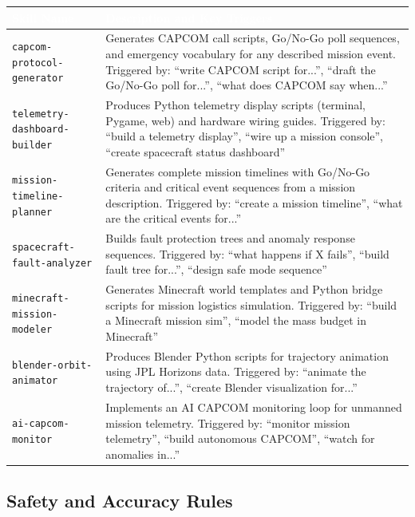 \documentclass[11pt,letterpaper]{article}
\newcommand{\tableheader}[1]{\textbf{\sffamily\textcolor{white}{#1}}}
\begin{document}
\begin{center}
\begin{tabularx}{\textwidth}{L{4.5cm}X}
\toprule
{}
\tableheader{Skill Name} & \tableheader{Description and Key Triggers} \\
\midrule
\texttt{capcom-protocol-generator} & Generates CAPCOM call scripts, Go/No-Go poll sequences, and emergency vocabulary for any described mission event. Triggered by: ``write CAPCOM script for...'', ``draft the Go/No-Go poll for...'', ``what does CAPCOM say when...'' \\
\texttt{telemetry-dashboard-builder} & Produces Python telemetry display scripts (terminal, Pygame, web) and hardware wiring guides. Triggered by: ``build a telemetry display'', ``wire up a mission console'', ``create spacecraft status dashboard'' \\
\texttt{mission-timeline-planner} & Generates complete mission timelines with Go/No-Go criteria and critical event sequences from a mission description. Triggered by: ``create a mission timeline'', ``what are the critical events for...'' \\
\texttt{spacecraft-fault-analyzer} & Builds fault protection trees and anomaly response sequences. Triggered by: ``what happens if X fails'', ``build fault tree for...'', ``design safe mode sequence'' \\
\texttt{minecraft-mission-modeler} & Generates Minecraft world templates and Python bridge scripts for mission logistics simulation. Triggered by: ``build a Minecraft mission sim'', ``model the mass budget in Minecraft'' \\
\texttt{blender-orbit-animator} & Produces Blender Python scripts for trajectory animation using JPL Horizons data. Triggered by: ``animate the trajectory of...'', ``create Blender visualization for...'' \\
\texttt{ai-capcom-monitor} & Implements an AI CAPCOM monitoring loop for unmanned mission telemetry. Triggered by: ``monitor mission telemetry'', ``build autonomous CAPCOM'', ``watch for anomalies in...'' \\
\bottomrule
\end{tabularx}
\end{center}

\subsection{Safety and Accuracy Rules}
\end{document}
